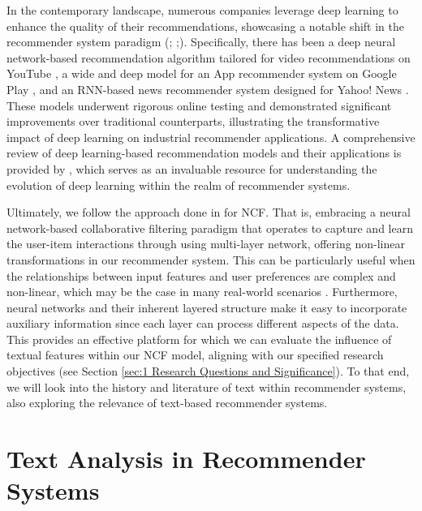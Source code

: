 In the contemporary landscape, numerous companies leverage deep learning to enhance the quality of their recommendations, showcasing a notable shift in the recommender system paradigm (\cite{cheng2016wide}; \cite{covington2016deep};\cite{okura2017embedding}). Specifically, there has been a deep neural network-based recommendation algorithm tailored for video recommendations on YouTube \cite{covington2016deep}, a wide and deep model for an App recommender system on Google Play \cite{cheng2016wide}, and an RNN-based news recommender system designed for Yahoo! News \cite{okura2017embedding}. These models underwent rigorous online testing and demonstrated significant improvements over traditional counterparts, illustrating the transformative impact of deep learning on industrial recommender applications. A comprehensive review of deep learning-based recommendation models and their applications is provided by \cite{zhang2019deep}, which serves as an invaluable resource for understanding the evolution of deep learning within the realm of recommender systems.

Ultimately, we follow the approach done in \cite{he2017neural} for NCF. That is, embracing a neural network-based collaborative filtering paradigm that operates to capture and learn the user-item interactions through using multi-layer network, offering non-linear transformations in our recommender system. This can be particularly useful when the relationships between input features and user preferences are complex and non-linear, which may be the case in many real-world scenarios \cite{he2017neural}. Furthermore, neural networks and their inherent layered structure make it easy to incorporate auxiliary information since each layer can process different aspects of the data. This provides an effective platform for which we can evaluate the influence of textual features within our NCF model, aligning with our specified research objectives (see Section \ref{sec:1 Research Questions and Significance}). To that end, we will look into the history and literature of text within recommender systems, also exploring the relevance of text-based recommender systems. 

\section{Text Analysis in Recommender Systems}
\label{sec:2 Text Analysis in Recommender Systems}

